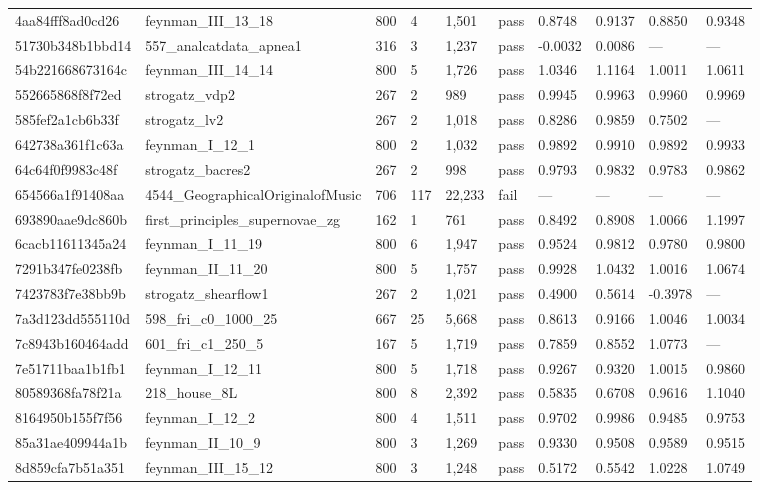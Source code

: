 \begin{longtable}{llllllllll}
4aa84fff8ad0cd26 & feynman\_III\_13\_18 & 800 & 4 & 1,501 & pass & 0.8748 & 0.9137 & 0.8850 & 0.9348\\
51730b348b1bbd14 & 557\_analcatdata\_apnea1 & 316 & 3 & 1,237 & pass & -0.0032 & 0.0086 & --- & ---\\
54b221668673164c & feynman\_III\_14\_14 & 800 & 5 & 1,726 & pass & 1.0346 & 1.1164 & 1.0011 & 1.0611\\
552665868f8f72ed & strogatz\_vdp2 & 267 & 2 & 989 & pass & 0.9945 & 0.9963 & 0.9960 & 0.9969\\
585fef2a1cb6b33f & strogatz\_lv2 & 267 & 2 & 1,018 & pass & 0.8286 & 0.9859 & 0.7502 & ---\\
642738a361f1c63a & feynman\_I\_12\_1 & 800 & 2 & 1,032 & pass & 0.9892 & 0.9910 & 0.9892 & 0.9933\\
64c64f0f9983c48f & strogatz\_bacres2 & 267 & 2 & 998 & pass & 0.9793 & 0.9832 & 0.9783 & 0.9862\\
654566a1f91408aa & 4544\_GeographicalOriginalofMusic & 706 & 117 & 22,233 & fail & --- & --- & --- & ---\\
693890aae9dc860b & first\_principles\_supernovae\_zg & 162 & 1 & 761 & pass & 0.8492 & 0.8908 & 1.0066 & 1.1997\\
6cacb11611345a24 & feynman\_I\_11\_19 & 800 & 6 & 1,947 & pass & 0.9524 & 0.9812 & 0.9780 & 0.9800\\
7291b347fe0238fb & feynman\_II\_11\_20 & 800 & 5 & 1,757 & pass & 0.9928 & 1.0432 & 1.0016 & 1.0674\\
7423783f7e38bb9b & strogatz\_shearflow1 & 267 & 2 & 1,021 & pass & 0.4900 & 0.5614 & -0.3978 & ---\\
7a3d123dd555110d & 598\_fri\_c0\_1000\_25 & 667 & 25 & 5,668 & pass & 0.8613 & 0.9166 & 1.0046 & 1.0034\\
7c8943b160464add & 601\_fri\_c1\_250\_5 & 167 & 5 & 1,719 & pass & 0.7859 & 0.8552 & 1.0773 & ---\\
7e51711baa1b1fb1 & feynman\_I\_12\_11 & 800 & 5 & 1,718 & pass & 0.9267 & 0.9320 & 1.0015 & 0.9860\\
80589368fa78f21a & 218\_house\_8L & 800 & 8 & 2,392 & pass & 0.5835 & 0.6708 & 0.9616 & 1.1040\\
8164950b155f7f56 & feynman\_I\_12\_2 & 800 & 4 & 1,511 & pass & 0.9702 & 0.9986 & 0.9485 & 0.9753\\
85a31ae409944a1b & feynman\_II\_10\_9 & 800 & 3 & 1,269 & pass & 0.9330 & 0.9508 & 0.9589 & 0.9515\\
8d859cfa7b51a351 & feynman\_III\_15\_12 & 800 & 3 & 1,248 & pass & 0.5172 & 0.5542 & 1.0228 & 1.0749\\

\end{longtable}
